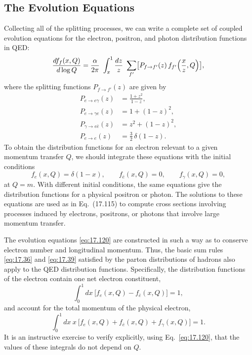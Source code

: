 \subsection{The Evolution Equations}

Collecting all of the splitting processes, we can write a complete set of
coupled evolution equations for the electron, positron, and photon
distribution functions in QED:
\begin{equation}
  \frac{df_f(x,Q)}{d\log Q} = \frac{\alpha}{2\pi}\ \int_x^1 \frac{dz}{z}\
    \sum_{f'} \bigl[ P_{f\to f'}(z)\,f_{f'}\Bigl( \frac{x}{z}, Q \Bigr)
    \bigr] ,
  \label{eq:17.120}
\end{equation}
where the splitting functions $P_{f\to f'}(z)$ are given by
\begin{equation}
  \begin{aligned}
    P_{e\to e\gamma}(z) &= \frac{1+z^2}{1-z},\\
    P_{e\to \gamma e}(z) &= 1 + (1-z)^2,\\
    P_{\gamma\to e\bar{e}}(z) &= z^2 + (1-z)^2,\\
    P_{e\to e}(z) &= \frac{3}{2}\,\delta(1-z) .
  \end{aligned}
  \label{eq:17.121}
\end{equation}
To obtain the distribution functions for an electron relevant to a given
momentum transfer $Q$, we should integrate these equations with the initial
conditions
\begin{equation}
  f_e(x,Q) = \delta(1-x),\qquad f_{\bar{e}}(x,Q) = 0,\qquad
  f_\gamma(x,Q) = 0 ,
  \label{eq:17.122}
\end{equation}
at $Q = m$.  With different initial conditions, the same equations give the
distribution functions for a physical positron or photon.  The solutions to
these equations are used as in Eq.~(17.115) to compute cross
sections involving processes induced by electrons, positrons, or photons that
involve large momentum transfer.

The evolution equations \eqref{eq:17.120} are constructed in such a way as to
conserve electron number and longitudinal momentum.  Thus, the basic sum
rules \eqref{eq:17.36} and \eqref{eq:17.39} satisfied by the parton
distributions of hadrons also apply to the QED distribution functions.
Specifically, the distribution functions of the electron contain one net
electron constituent,
\begin{equation}
  \int_0^1 dx\ \bigl[ f_e(x,Q) - f_{\bar{e}}(x,Q) \bigr] = 1 ,
  \label{eq:17.123}
\end{equation}
and account for the total momentum of the physical electron,
\begin{equation}
  \int_0^1 dx\ x\ \bigl[ f_e(x,Q) + f_{\bar{e}}(x,Q) + f_\gamma(x,Q) \bigr]
  = 1 .
  \label{eq:17.124}
\end{equation}
It is an instructive exercise to verify explicitly, using Eq.~\eqref{eq:17.120},
that the values of these integrals do not depend on $Q$.

